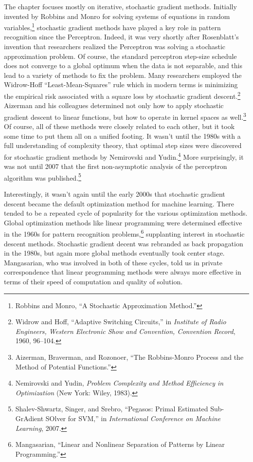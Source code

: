 \documentclass{tufte-book}
\begin{document}
The chapter focuses mostly on iterative, stochastic gradient methods.
Initially invented by Robbins and Monro for solving systems of equations
in random variables,\footnote{Robbins and Monro, {``A Stochastic
  Approximation Method.''}} stochastic gradient methods have played a
key role in pattern recognition since the Perceptron. Indeed, it was
very shortly after Rosenblatt's invention that researchers realized the
Perceptron was solving a stochastic approximation problem. Of course,
the standard perceptron step-size schedule does not converge to a global
optimum when the data is not separable, and this lead to a variety of
methods to fix the problem. Many researchers employed the Widrow-Hoff
``Least-Mean-Squares'' rule which in modern terms is minimizing the
empirical risk associated with a square loss by stochastic gradient
descent.\footnote{Widrow and Hoff, {``Adaptive Switching Circuits,''} in
  \emph{Institute of Radio Engineers, Western Electronic Show and
  Convention, Convention Record}, 1960, 96--104.} Aizerman and his
colleagues determined not only how to apply stochastic gradient descent
to linear functions, but how to operate in kernel spaces as
well.\footnote{Aizerman, Braverman, and Rozonoer, {``The Robbins-Monro
  Process and the Method of Potential Functions.''}} Of course, all of
these methods were closely related to each other, but it took some time
to put them all on a unified footing. It wasn't until the 1980s with a
full understanding of complexity theory, that optimal step sizes were
discovered for stochastic gradient methods by Nemirovski and
Yudin.\footnote{Nemirovski and Yudin, \emph{Problem Complexity and
  Method Efficiency in Optimization} (New York: Wiley, 1983).} More
surprisingly, it was not until 2007 that the first non-asymptotic
analysis of the perceptron algorithm was published.\footnote{Shalev-Shwartz,
  Singer, and Srebro, {``Pegasos: {P}rimal Estimated Sub-{G}r{A}dient
  {SO}lver for {SVM},''} in \emph{International Conference on Machine
  Learning}, 2007.}

Interestingly, it wasn't again until the early 2000s that stochastic
gradient descent became the default optimization method for machine
learning. There tended to be a repeated cycle of popularity for the
various optimization methods. Global optimization methods like linear
programming were determined effective in the 1960s for pattern
recognition problems,\footnote{Mangasarian, {``Linear and Nonlinear
  Separation of Patterns by Linear Programming.''}} supplanting interest
in stochastic descent methods. Stochastic gradient decent was rebranded
as back propagation in the 1980s, but again more global methods
eventually took center stage. Mangasarian, who was involved in both of
these cycles, told us in private correspondence that linear programming
methods were always more effective in terms of their speed of
computation and quality of solution.
\end{document}
